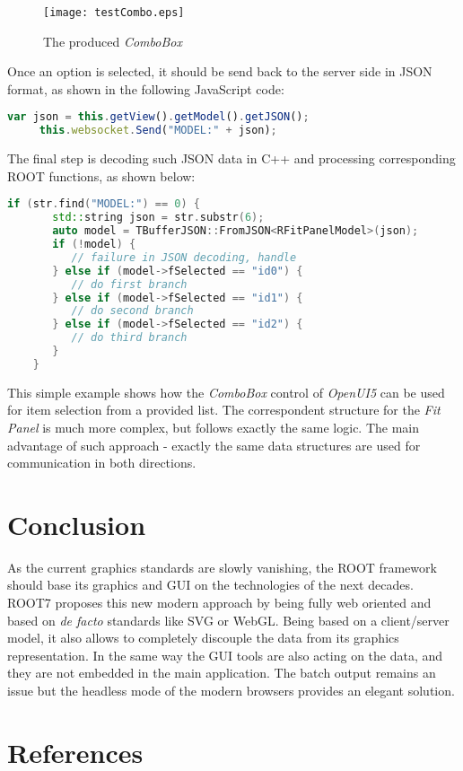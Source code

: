 \documentclass[a4paper]{jpconf}
\begin{document}
\begin{figure}[h]
  \begin{center}
    \texttt{[image: testCombo.eps]}\hspace{2pc}%
  \end{center}
  \centering
\begin{minipage}[b]{20pc}\caption{\label{label}The produced \textit{ComboBox}}
\end{minipage}
\end{figure}

\newpage
Once an option is selected, it should be send back to the server side in JSON format, as shown in the following JavaScript code:

\begin{lstlisting}[language=JavaScript,numbers=none]
     var json = this.getView().getModel().getJSON();
     this.websocket.Send("MODEL:" + json);
\end{lstlisting}

The final step is decoding such JSON data in C++ and processing corresponding ROOT functions, as shown below:

\begin{lstlisting}[language=C++,numbers=none]
    if (str.find("MODEL:") == 0) {
       std::string json = str.substr(6);
       auto model = TBufferJSON::FromJSON<RFitPanelModel>(json);
       if (!model) {
          // failure in JSON decoding, handle
       } else if (model->fSelected == "id0") {
          // do first branch
       } else if (model->fSelected == "id1") {
          // do second branch
       } else if (model->fSelected == "id2") {
          // do third branch
       }
    }
\end{lstlisting}

This simple example shows how the \textit{ComboBox} control of \textit{OpenUI5} can be used for item selection from a provided list.
The correspondent structure for the \textit{Fit Panel} is much more complex, but follows exactly the same logic.
The main advantage of such approach - exactly the same data structures are used for communication in both directions.


\section{Conclusion}

As the current graphics standards are slowly vanishing, the ROOT framework should
base its graphics and GUI on the technologies of the next decades. ROOT7 proposes
this new modern approach by being fully web oriented and based on \textit{de facto} standards
like SVG or WebGL. Being based on a client/server model, it also allows to completely
discouple the data from its graphics representation. In the same way the GUI tools
are also acting on the data, and they are not embedded in the main application.
The batch output remains an issue but the headless mode of the modern browsers provides an elegant solution.


\section{References}

\end{document}
